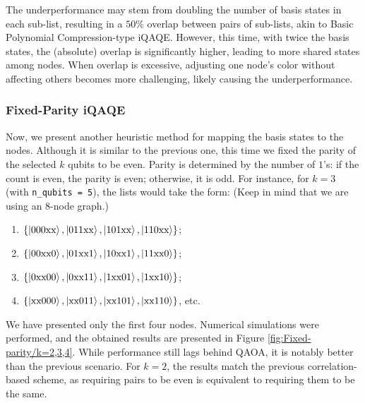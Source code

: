 The underperformance may stem from doubling the number of basis states in each sub-list, resulting in a $50\%$ overlap between pairs of sub-lists, akin to Basic Polynomial Compression-type iQAQE. However, this time, with twice the basis states, the (absolute) overlap is significantly higher, leading to more shared states among nodes. When overlap is excessive, adjusting one node's color without affecting others becomes more challenging, likely causing the underperformance.

\subsubsection{Fixed-Parity iQAQE}
\label{subsubsection:Fixed-Parity_iQAQE}

Now, we present another heuristic method for mapping the basis states to the nodes. Although it is similar to the previous one, this time we fixed the parity of the selected $k$ qubits to be even. Parity is determined by the number of $1$'s: if the count is even, the parity is even; otherwise, it is odd. For instance, for $k=3$ (with \texttt{n\_qubits = 5}), the lists would take the form: (Keep in mind that we are using an $8$-node graph.)
{\normalsize\begin{enumerate}[itemsep=0mm]
    \item $\left\{\ket{000\text{xx}}, \ket{011\text{xx}}, \ket{101\text{xx}}, \ket{110\text{xx}}\right\}$;
    \item $\left\{\ket{00\text{xx}0}, \ket{01\text{xx}1}, \ket{10\text{xx}1}, \ket{11\text{xx}0}\right\}$;
    \item $\left\{\ket{0\text{xx}00}, \ket{0\text{xx}11}, \ket{1\text{xx}01}, \ket{1\text{xx}10}\right\}$;
    \item $\left\{\ket{\text{xx}000}, \ket{\text{xx}011}, \ket{\text{xx}101}, \ket{\text{xx}110}\right\}$, etc.
\end{enumerate}} %
\noindent We have presented only the first four nodes. Numerical simulations were performed, and the obtained results are presented in Figure \ref{fig:Fixed-parity/k=2,3,4}. While performance still lags behind QAOA, it is notably better than the previous scenario. For $k=2$, the results match the previous correlation-based scheme, as requiring pairs to be even is equivalent to requiring them to be the same.
